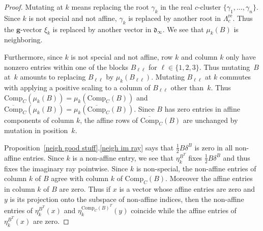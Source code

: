 \documentclass[10pt]{article}
\theoremstyle{definition}
\theoremstyle{remark}
\numberwithin{equation}{section}
\newcommand{\set}[1]{{\lbrace #1 \rbrace}}
\newcommand{\0}{{\mathbf{0}}}
\newcommand{\Comp}{\mathrm{Comp}_C}
\newcommand{\CompPlus}{\overline{\mathrm{Comp}}_C}
\newcommand{\g}{\mathbf{g}}
\newcommand{\re}{\mathrm{re}}
\renewcommand{\d}{{\mathfrak d}}
\newcommand{\APTChar}{\Lambda}
\newcommand{\APT}[1]{\APTChar_{#1}}
\newcommand{\APTre}[1]{\APT{#1}^\re}
\begin{document}
\begin{proof}
Mutating at $k$ means replacing the root $\gamma_k$ in the real $c$-cluster $\set{\gamma_1,\ldots,\gamma_n}$.
Since $k$ is not special and not affine, $\gamma_k$ is replaced by another root in $\APTre{c}$.
Thus the $\g$-vector $\xi_k$ is replaced by another vector in $\d_\infty$.
We see that $\mu_k(B)$ is neighboring.

Furthermore, since $k$ is not special and not affine, row $k$ and column $k$ only have nonzero entries within one of the blocks $B_{\ell\ell}$ for $\ell\in\set{1,2,3}$.
Thus mutating~$B$ at~$k$ amounts to replacing $B_{\ell\ell}$ by $\mu_k(B_{\ell\ell})$.
Mutating $B_{\ell\ell}$ at $k$ commutes with applying a positive scaling to a column of $B_{\ell\ell}$ other than~$k$.
Thus $\Comp(\mu_k(B))=\mu_k(\Comp(B))$ and ${\CompPlus(\mu_k(B))=\mu_k(\CompPlus(B))}$.
Since $B$ has zero entries in affine components of column $k$, the affine rows of $\CompPlus(B)$ are unchanged by mutation in position~$k$.

Proposition~\ref{neigh good stuff}.\ref{neigh im ray} says that $\frac12B\delta^B$ is zero in all non-affine entries.
Since $k$ is a non-affine entry, we see that $\eta^{B^T}_k$ fixes $\frac12B\delta^B$ and thus fixes the imaginary ray pointwise.
Since $k$ is non-special, the non-affine entries of column $k$ of $B$ agree with column $k$ of $\Comp(B)$.
Moreover the affine entries in column $k$ of $B$ are zero.
Thus if $x$ is a vector whose affine entries are zero and $y$ is its projection onto the subspace of non-affine indices, then the non-affine entries of $\eta^{B^T}_k(x)$ and $\eta^{\Comp(B)^T}_k(y)$ coincide while the affine entries of $\eta^{B^T}_k(x)$ are zero.
\end{proof}
\end{document}
